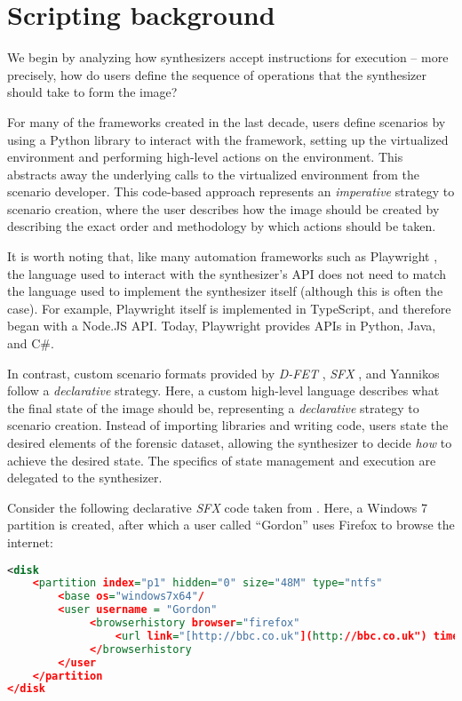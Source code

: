 \section{Scripting background}\label{scripting-background}

We begin by analyzing how synthesizers accept instructions for execution
-- more precisely, how do users define the sequence of operations that
the synthesizer should take to form the image?

For many of the frameworks created in the last decade, users define
scenarios by using a Python library to interact with the framework,
setting up the virtualized environment and performing high-level actions
on the environment. This abstracts away the underlying calls to the
virtualized environment from the scenario developer. This code-based
approach represents an \emph{imperative} strategy to scenario creation,
where the user describes how the image should be created by describing
the exact order and methodology by which actions should be taken.

It is worth noting that, like many automation frameworks such as
Playwright \cite{MicrosoftPlaywrightpython2025}, the language used
to interact with the synthesizer's API does not need to match the
language used to implement the synthesizer itself (although this is
often the case). For example, Playwright itself is implemented in
TypeScript, and therefore began with a Node.JS API. Today, Playwright
provides APIs in Python, Java, and C\#.

In contrast, custom scenario formats provided by \emph{D-FET}
\cite{williamCloudbasedDigitalForensics2011}, \emph{SFX}
\cite{russellForensicImageDescription2012}, and Yannikos
\cite{yannikosDataCorporaDigital2014} follow a \emph{declarative}
strategy. Here, a custom high-level language describes what the final
state of the image should be, representing a \emph{declarative} strategy
to scenario creation. Instead of importing libraries and writing code,
users state the desired elements of the forensic dataset, allowing the
synthesizer to decide \emph{how} to achieve the desired state. The
specifics of state management and execution are delegated to the
synthesizer.

Consider the following declarative \emph{SFX} code taken from
\cite{russellForensicImageDescription2012}. Here, a Windows 7
partition is created, after which a user called ``Gordon'' uses Firefox
to browse the internet:

\begin{lstlisting}[language=XML]
<disk
    <partition index="p1" hidden="0" size="48M" type="ntfs"
        <base os="windows7x64"/
        <user username = "Gordon"
             <browserhistory browser="firefox"
                 <url link="[http://bbc.co.uk"](http://bbc.co.uk") time="13:14:00 1 Jan 2013"/
             </browserhistory
        </user
    </partition
</disk
\end{lstlisting}

